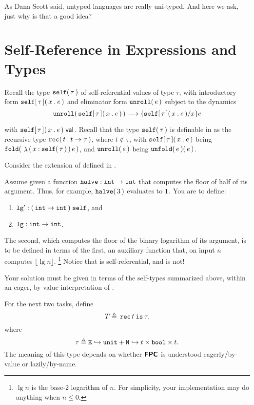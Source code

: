 \documentclass[11pt]{article}
\begin{document}
As Dana Scott said, untyped languages are really uni-typed.  And here we ask, just why is that a good idea?

\noindent

\section{Self-Reference in Expressions and Types}

Recall the type $\selftyabt{\tau}$ of self-referential values of type $\tau$, with introductory form $\selfexabt{\tau}{x}{e}$ and eliminator form $\unselfexabt{e}$ subject to the dynamics
\[
  \unselfexabt{\selfexabt{\tau}{x}{e}} \StepsTo \Subst{\selfexabt{\tau}{x}{e}}{x}{e}
\]
with $\IsVal{\selfexabt{\tau}{x}{e}}$.  Recall that the type $\selftyabt{\tau}$ is definable in \LangFPC{} as the recursive type $\rectyabt{t}{t\to\tau}$, where $t\notin\tau$, with $\selfexabt{\tau}{x}{e}$ being $\foldexcst{t}{\dots}{\lamcst{\selftyabt{\tau}}{x}{e}}$, and $\unselfexabt{e}$ being $\appcst{\unfoldexcst{e}}{e}$.

Consider the extension of \LangFPC{} defined in .

\newcommand{\floor}[1]{\ensuremath{\lfloor #1\rfloor}}

Assume given a function $\kw{halve}:\arrtycst{\inttycst}{\inttycst}$ that computes the floor of half of its argument.  Thus, for example, $\appcst{\kw{halve}}{\intexcst{3}}$ evaluates to $\intexcst{1}$.  You are to define:
\begin{enumerate}
  \item $\kw{lg'}:\selftycst{\cdparens{\arrtycst{\inttycst}{\inttycst}}}$, and
  \item $\kw{lg}:\arrtycst{\inttycst}{\inttycst}$.
\end{enumerate}
The second, which computes the floor of the binary logarithm of its argument, is to be defined in terms of the first, an auxiliary function that, on input $n$ computes $\floor{\lg n}$.%
\footnote{$\lg n$ is the base-2 logarithm of $n$. For simplicity, your implementation may do anything when $n \le 0$.}
Notice that  is self-referential, and  is not!

Your solution must be given in terms of the self-types summarized above, within an eager, by-value interpretation of \LangFPC{}.


\bigskip

For the next two tasks, define
\[
  T \isdef{} \rectycst{t}{\tau},
\]
where
\[
  \tau \isdef{} \sumtycst{\Fld{\Elbl}{\unittycst}}{\Fld{\Nlbl}{\triptycst{t}{\booltycst}{t}}}.
\]
The meaning of this type depends on whether $\LangFPC$ is understood eagerly/by-value or lazily/by-name.
\end{document}
